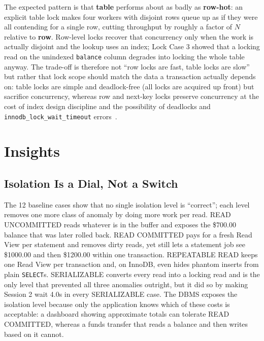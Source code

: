 \documentclass[sigconf, pbalance, nonacm]{acmart}
\begin{document}
The expected pattern is that \textbf{table} performs about as badly as \textbf{row-hot}: an explicit table lock makes four workers with disjoint rows queue up as if they were all contending for a single row, cutting throughput by roughly a factor of $N$ relative to \textbf{row}. Row-level locks recover that concurrency only when the work is actually disjoint and the lookup uses an index; Lock Case 3 showed that a locking read on the unindexed \texttt{balance} column degrades into locking the whole table anyway. The trade-off is therefore not ``row locks are fast, table locks are slow'' but rather that lock scope should match the data a transaction actually depends on: table locks are simple and deadlock-free (all locks are acquired up front) but sacrifice concurrency, whereas row and next-key locks preserve concurrency at the cost of index design discipline and the possibility of deadlocks and \texttt{innodb\_lock\_wait\_timeout} errors~\cite{MySQLLocking}.

\section{Insights}

\subsection{Isolation Is a Dial, Not a Switch}
The 12 baseline cases show that no single isolation level is ``correct''; each level removes one more class of anomaly by doing more work per read. READ UNCOMMITTED reads whatever is in the buffer and exposes the \$700.00 balance that was later rolled back. READ COMMITTED pays for a fresh Read View per statement and removes dirty reads, yet still lets a statement job see \$1000.00 and then \$1200.00 within one transaction. REPEATABLE READ keeps one Read View per transaction and, on InnoDB, even hides phantom inserts from plain \texttt{SELECT}s. SERIALIZABLE converts every read into a locking read and is the only level that prevented all three anomalies outright, but it did so by making Session 2 wait 4.0s in every SERIALIZABLE case. The DBMS exposes the isolation level because only the application knows which of these costs is acceptable: a dashboard showing approximate totals can tolerate READ COMMITTED, whereas a funds transfer that reads a balance and then writes based on it cannot.
\end{document}
